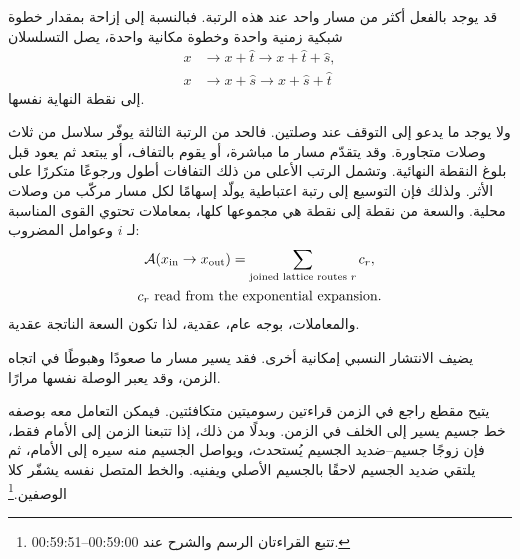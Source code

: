 قد يوجد بالفعل أكثر من مسار واحد عند هذه الرتبة. فبالنسبة إلى إزاحة بمقدار خطوة شبكية زمنية واحدة وخطوة مكانية واحدة، يصل التسلسلان
\begin{align}
x
&\longrightarrow x+\hat t
\longrightarrow x+\hat t+\hat s,\\
x
&\longrightarrow x+\hat s
\longrightarrow x+\hat s+\hat t
\end{align}
إلى نقطة النهاية نفسها.

\begin{classroomqa}
\end{classroomqa}

ولا يوجد ما يدعو إلى التوقف عند وصلتين. فالحد من الرتبة الثالثة يوفّر سلاسل من ثلاث وصلات متجاورة. وقد يتقدّم مسار ما مباشرة، أو يقوم بالتفاف، أو يبتعد ثم يعود قبل بلوغ النقطة النهائية. وتشمل الرتب الأعلى من ذلك التفافات أطول ورجوعًا متكررًا على الأثر. ولذلك فإن التوسيع إلى رتبة اعتباطية يولّد إسهامًا لكل مسار مركّب من وصلات محلية. والسعة من نقطة إلى نقطة هي مجموعها كلها، بمعاملات تحتوي القوى المناسبة لـ \(i\) وعوامل المضروب:
\begin{equation}
\begin{gathered}
\mathcal{A}(x_{\mathrm{in}}\to x_{\mathrm{out}})
=
\sum_{\text{joined lattice routes }r}c_r,
\\
c_r\ \hbox{read from the exponential expansion}.
\end{gathered}
\end{equation}
والمعاملات، بوجه عام، عقدية، لذا تكون السعة الناتجة عقدية.

يضيف الانتشار النسبي إمكانية أخرى. فقد يسير مسار ما صعودًا وهبوطًا في اتجاه الزمن، وقد يعبر الوصلة نفسها مرارًا.

\begin{classroomqa}
\end{classroomqa}

يتيح مقطع راجع في الزمن قراءتين رسوميتين متكافئتين. فيمكن التعامل معه بوصفه خط جسيم يسير إلى الخلف في الزمن. وبدلًا من ذلك، إذا تتبعنا الزمن إلى الأمام فقط، فإن زوجًا جسيم--ضديد الجسيم يُستحدث، ويواصل الجسيم منه سيره إلى الأمام، ثم يلتقي ضديد الجسيم لاحقًا بالجسيم الأصلي ويفنيه. والخط المتصل نفسه يشفّر كلا الوصفين.\footnote{تتبع القراءتان الرسم والشرح عند 00:59:00--00:59:51.}

